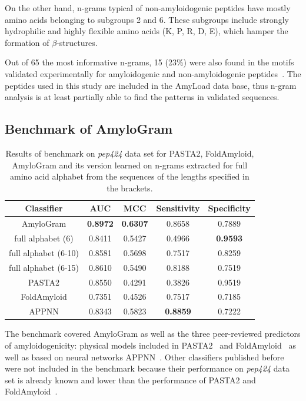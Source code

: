 \documentclass[fleqn,10pt,twoside]{gcb15submission}
\begin{document}
  On the other hand, n-grams typical of non-amyloidogenic peptides have mostly 
amino acids belonging to subgroups 2 and 6. These subgroups include strongly 
hydrophilic and highly flexible amino acids (K, P, R, D, E), which hamper the 
formation of $\beta$-structures.

  Out of 65 the most informative n-grams, 15 (23\%) were also found in the motifs 
validated experimentally for amyloidogenic and non-amyloidogenic 
peptides~\citep{lopez_de_la_paz_sequence_2004}. The peptides used in this study are 
included in the AmyLoad data base, thus n-gram analysis is at least 
partially able to find the patterns in validated sequences.

\subsection{Benchmark of AmyloGram}

\begin{table}[ht]
\centering
\small
\caption{Results of benchmark on \textit{pep424} data set for PASTA2, 
FoldAmyloid, AmyloGram and its version learned on n-grams extracted for full amino acid alphabet from the sequences of the lengths specified in 
the brackets.} 
\label{tab:bench_summary}
\begin{tabular}{ccccc}
  \toprule
Classifier & AUC & MCC & Sensitivity & Specificity \\ 
  \midrule
AmyloGram & \textbf{0.8972} & \textbf{0.6307} & 0.8658 & 0.7889 \\ 
   \rowcolor[gray]{0.85}full alphabet (6) & 0.8411 & 0.5427 & 0.4966 & 
\textbf{0.9593} \\ 
  full alphabet (6-10) & 0.8581 & 0.5698 & 0.7517 & 0.8259 \\ 
   \rowcolor[gray]{0.85}full alphabet (6-15) & 0.8610 & 0.5490 & 0.8188 & 
0.7519 \\ 
\hline \hline
  PASTA2 & 0.8550 & 0.4291 & 0.3826 & 0.9519 \\ 
   \rowcolor[gray]{0.85}FoldAmyloid & 0.7351 & 0.4526 & 0.7517 & 0.7185 \\ 
  APPNN & 0.8343 & 0.5823 & \textbf{0.8859} & 0.7222 \\ 
   \bottomrule
\end{tabular}
\end{table}

The benchmark covered AmyloGram as well as the three peer-reviewed predictors of 
amyloidogenicity: physical models included in PASTA2~\citep{walsh_pasta_2014} and 
FoldAmyloid~\citep{garbuzynskiy_foldamyloid:_2010} as well as based on neural networks 
APPNN~\citep{familia_prediction_2015}. Other classifiers published before were 
not included in the benchmark because their performance on \textit{pep424} 
data set is already known and lower than the performance of PASTA2 and 
FoldAmyloid~\citep{walsh_pasta_2014}.
\end{document}
